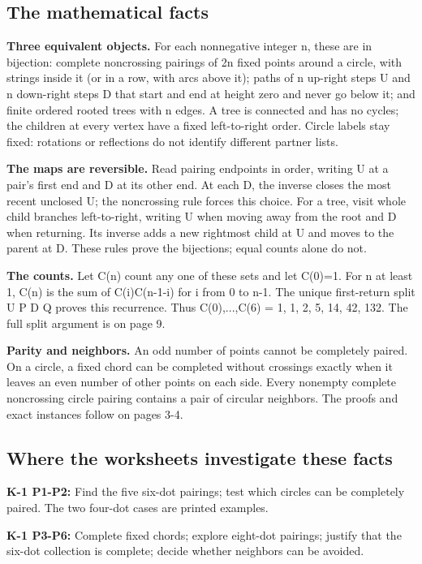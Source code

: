 \subsection*{The mathematical facts}
\textbf{Three equivalent objects.} For each nonnegative integer n, these are in bijection: complete noncrossing pairings of 2n fixed points around a circle, with strings inside it (or in a row, with arcs above it); paths of n up-right steps U and n down-right steps D that start and end at height zero and never go below it; and finite ordered rooted trees with n edges. A tree is connected and has no cycles; the children at every vertex have a fixed left-to-right order. Circle labels stay fixed: rotations or reflections do not identify different partner lists.

\textbf{The maps are reversible.} Read pairing endpoints in order, writing U at a pair's first end and D at its other end. At each D, the inverse closes the most recent unclosed U; the noncrossing rule forces this choice. For a tree, visit whole child branches left-to-right, writing U when moving away from the root and D when returning. Its inverse adds a new rightmost child at U and moves to the parent at D. These rules prove the bijections; equal counts alone do not.

\textbf{The counts.} Let C(n) count any one of these sets and let C(0)=1. For n at least 1, C(n) is the sum of C(i)C(n-1-i) for i from 0 to n-1. The unique first-return split U P D Q proves this recurrence. Thus C(0),...,C(6) = 1, 1, 2, 5, 14, 42, 132. The full split argument is on page 9.

\textbf{Parity and neighbors.} An odd number of points cannot be completely paired. On a circle, a fixed chord can be completed without crossings exactly when it leaves an even number of other points on each side. Every nonempty complete noncrossing circle pairing contains a pair of circular neighbors. The proofs and exact instances follow on pages 3-4.

\subsection*{Where the worksheets investigate these facts}
\textbf{K-1 P1-P2:} Find the five six-dot pairings; test which circles can be completely paired. The two four-dot cases are printed examples.

\textbf{K-1 P3-P6:} Complete fixed chords; explore eight-dot pairings; justify that the six-dot collection is complete; decide whether neighbors can be avoided.

